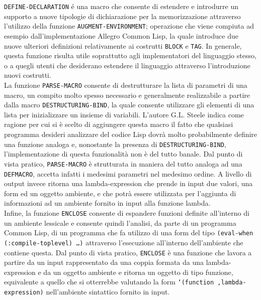 \texttt{DEFINE-DECLARATION} é una macro che consente di estendere e introdurre
un supporto a nuove tipologie di dichiarazione per la memorizzazione attraverso
l'utilizzo della funzione \texttt{AUGMENT-ENVIRONMENT}; operazione che viene
compiuta ad esempio dall’implementazione Allegro Common Lisp, la quale introduce
due nuove ulteriori definizioni relativamente ai costrutti \texttt{BLOCK} e
\texttt{TAG}. In generale, questa funzione risulta utile soprattutto agli
implementatori del linguaggio stesso, o a quegli utenti che desiderano estendere
il linguaggio attraverso l'introduzione nuovi costrutti.\\

La funzione \texttt{PARSE-MACRO} consente di destrutturare la lista di parametri
di una macro, un compito molto spesso necessario e generalmente realizzabile a
partire dalla macro \texttt{DESTRUCTURING-BIND}, la quale consente utilizzare
gli elementi di una lista per inizializzare un insieme di variabili. L’autore
G.L. Steele indica come ragione per cui si è scelto di aggiungere questa macro
il fatto che qualsiasi programma desideri analizzare del codice Lisp dovrà molto
probabilmente definire una funzione analoga e, nonostante la presenza di \texttt
{DESTRUCTURING-BIND}, l’implementazione di questa funzionalità non è del tutto
banale. \cite{steele1990common} Dal punto di vista pratico,
\texttt{PARSE-MACRO} è strutturata in maniera del tutto analoga ad una
\texttt{DEFMACRO}, accetta infatti i medesimi parametri nel medesimo ordine. A
livello di output invece ritorna una lambda-expression che prende in input due
valori, una form ed un oggetto ambiente, e che potrà essere utilizzata per
l'aggiunta di informazioni ad un ambiente fornito in input alla funzione
lambda.\\

Infine, la funzione \texttt{ENCLOSE} consente di espandere funzioni definite
all’interno di un ambiente lessicale e consente quindi l’analisi, da parte di un
programma Common Lisp, di un programma che fa utilizzo di una form del tipo
\texttt{(eval-when (:compile-toplevel) …)} attraverso l’esecuzione all’interno
dell’ambiente che contiene questa. Dal punto di vista pratico, \texttt{ENCLOSE}
è una funzione che lavora a partire da un input rappresentato da una coppia
formata da una lambda-expression e da un oggetto ambiente e ritorna un oggetto
di tipo funzione, equivalente a quello che si otterrebbe valutando la form
\texttt{`(function ,lambda-expression)} nell'ambiente sintattico fornito in
input.

